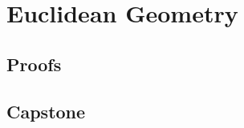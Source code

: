 \chapter{Euclidean Geometry}
\label{chap:euclidean-geometry}




\LRAExcludeFromPrintEditionBegin
\section*{Proofs}


\section*{Capstone}

\LRAExcludeFromPrintEditionEnd